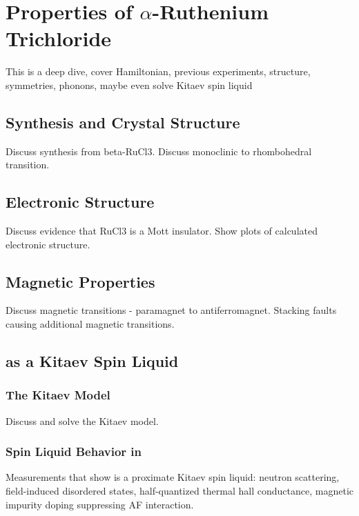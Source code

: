 \chapter{Properties of $\alpha$-Ruthenium Trichloride}
This is a deep dive, cover Hamiltonian, previous experiments, structure, symmetries, phonons, maybe even solve Kitaev spin liquid

\section{Synthesis and Crystal Structure}

Discuss synthesis from beta-RuCl3. Discuss monoclinic to rhombohedral transition.

\section{Electronic Structure}

Discuss evidence that RuCl3 is a Mott insulator. Show plots of calculated electronic structure.

\section{Magnetic Properties}

Discuss magnetic transitions - paramagnet to antiferromagnet. Stacking faults causing additional magnetic transitions.

\section{\rucl as a Kitaev Spin Liquid}

\subsection{The Kitaev Model}

Discuss and solve the Kitaev model.

\subsection{Spin Liquid Behavior in \rucl}

Measurements that show \rucl is a proximate Kitaev spin liquid: neutron scattering, field-induced disordered states, half-quantized thermal hall conductance, magnetic impurity doping suppressing AF interaction.